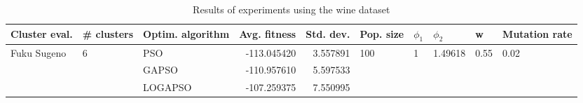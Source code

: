 \begin{table}
\centering
\caption{Results of experiments using the wine dataset}
\begin{tabular}{lllrrlllll}
\toprule
               Cluster eval. &        \# clusters & Optim. algorithm &  Avg. fitness &  Std. dev. &            Pop. size &         $\phi_{1}$ &               $\phi_{2}$ &                     w &         Mutation rate \\
\midrule
\multirow{3}{*}{Fuku Sugeno} & \multirow{3}{*}{6} &              PSO &   -113.045420 &   3.557891 & \multirow{3}{*}{100} & \multirow{3}{*}{1} & \multirow{3}{*}{1.49618} & \multirow{3}{*}{0.55} & \multirow{3}{*}{0.02} \\
                             &                    &            GAPSO &   -110.957610 &   5.597533 &                      &                    &                          &                       &                       \\
                             &                    &          LOGAPSO &   -107.259375 &   7.550995 &                      &                    &                          &                       &                       \\
\bottomrule
\end{tabular}
\end{table}
